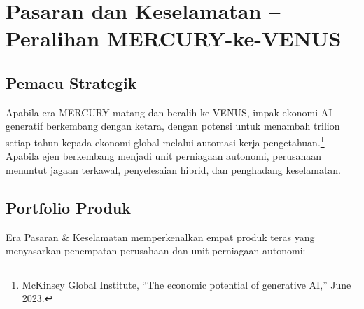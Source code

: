 \documentclass[11pt]{article}
\begin{document}
\section{Pasaran dan Keselamatan -- Peralihan MERCURY-ke-VENUS}
\subsection{Pemacu Strategik}
Apabila era MERCURY matang dan beralih ke VENUS, impak ekonomi AI generatif berkembang dengan ketara, dengan potensi untuk menambah trilion setiap tahun kepada ekonomi global melalui automasi kerja pengetahuan.\footnote{McKinsey Global Institute, ``The economic potential of generative AI,'' June 2023.} Apabila ejen berkembang menjadi unit perniagaan autonomi, perusahaan menuntut jagaan terkawal, penyelesaian hibrid, dan penghadang keselamatan.

\subsection{Portfolio Produk}
Era Pasaran \& Keselamatan memperkenalkan empat produk teras yang menyasarkan penempatan perusahaan dan unit perniagaan autonomi:
\end{document}
